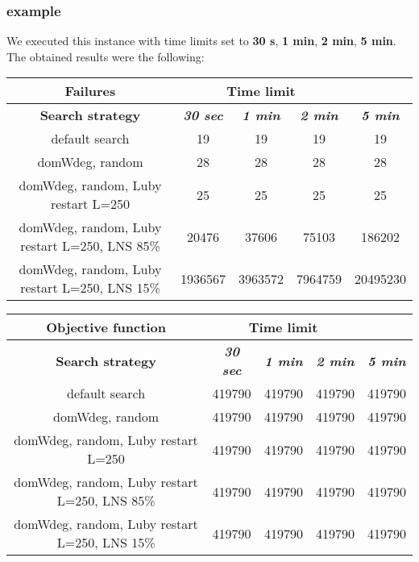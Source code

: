 \subsubsection{example}
We executed this instance with time limits set to \textbf{30 s}, \textbf{1 min}, \textbf{2 min}, \textbf{5 min}.\\
The obtained results were the following:
{
\renewcommand{\arraystretch}{2}
\begin{longtable}[h]{| c | c | c | c | c |}
    \hline
    \textbf{Failures} & \multicolumn{3}{c}{Time limit} & \\
    \hline
    \textbf{Search strategy} & \textbf{\textit{30 sec}} & \textbf{\textit{1 min}} & \textbf{\textit{2 min}} & \textbf{\textit{5 min}} \\
    \hline
    \endhead
    default search                                &      19 &      19 &      19 &       19 \\
    \hline
    domWdeg, random                               &      28 &      28 &      28 &       28 \\
    \hline
    domWdeg, random, Luby restart L=250           &      25 &      25 &      25 &       25 \\
    \hline
    domWdeg, random, Luby restart L=250, LNS 85\% &   20476 &   37606 &   75103 &   186202 \\
    \hline
    domWdeg, random, Luby restart L=250, LNS 15\% & 1936567 & 3963572 & 7964759 & 20495230 \\
    \hline
\end{longtable}
}

{
\renewcommand{\arraystretch}{2}
\begin{longtable}[h]{| c | c | c | c | c |}
    \hline
    \textbf{Objective function} & \multicolumn{3}{c}{Time limit} & \\
    \hline
    \textbf{Search strategy} & \textbf{\textit{30 sec}} & \textbf{\textit{1 min}} & \textbf{\textit{2 min}} & \textbf{\textit{5 min}} \\
    \hline
    \endhead
    default search                                & 419790 & 419790 & 419790 & 419790 \\
    \hline
    domWdeg, random                               & 419790 & 419790 & 419790 & 419790 \\
    \hline
    domWdeg, random, Luby restart L=250           & 419790 & 419790 & 419790 & 419790 \\
    \hline
    domWdeg, random, Luby restart L=250, LNS 85\% & 419790 & 419790 & 419790 & 419790 \\
    \hline
    domWdeg, random, Luby restart L=250, LNS 15\% & 419790 & 419790 & 419790 & 419790 \\
    \hline
\end{longtable}
}
